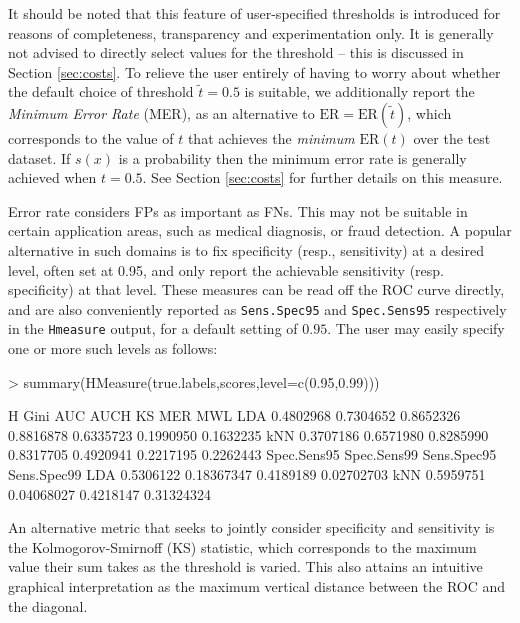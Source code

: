 \documentclass{article}
\begin{document}
It should be noted that this feature of user-specified thresholds is introduced for reasons of completeness, transparency and experimentation only. It is generally not advised to directly select values for the threshold -- this is discussed in Section \ref{sec:costs}. To relieve the user entirely of having to worry about whether the default choice of threshold $\tilde{t}=0.5$ is suitable, we additionally report the \emph{Minimum Error Rate} (MER), as an alternative to  $\text{ER} = \text{ER}(\tilde{t})$, which corresponds to the value of $t$ that achieves the \emph{minimum} $\text{ER}(t)$ over the test dataset. If $s(x)$ is a probability then the minimum error rate is generally achieved when $t=0.5$. See Section \ref{sec:costs} for further details on this measure.

Error rate considers FPs as important as FNs. This may not be suitable in certain application areas, such as medical diagnosis, or fraud detection. A popular alternative in such domains is to fix specificity (resp., sensitivity) at a desired level, often set at 0.95, and only report the achievable sensitivity (resp. specificity) at that level. These measures can be read off the ROC curve directly, and are also conveniently reported as \verb+Sens.Spec95+ and \verb+Spec.Sens95+ respectively in the \verb+Hmeasure+ output, for a default setting of $0.95$. The user may easily specify one or more such levels as follows:
\begin{Schunk}
\begin{Sinput}
> summary(HMeasure(true.labels,scores,level=c(0.95,0.99)))
\end{Sinput}
\begin{Soutput}
            H      Gini       AUC      AUCH        KS       MER       MWL
LDA 0.4802968 0.7304652 0.8652326 0.8816878 0.6335723 0.1990950 0.1632235
kNN 0.3707186 0.6571980 0.8285990 0.8317705 0.4920941 0.2217195 0.2262443
    Spec.Sens95 Spec.Sens99 Sens.Spec95 Sens.Spec99
LDA   0.5306122  0.18367347   0.4189189  0.02702703
kNN   0.5959751  0.04068027   0.4218147  0.31324324
\end{Soutput}
\end{Schunk}

An alternative metric that seeks to jointly consider specificity and sensitivity is the Kolmogorov-Smirnoff (KS) statistic, which corresponds to the maximum value their sum takes as the threshold is varied. This also attains an intuitive graphical interpretation as the maximum vertical distance between the ROC and the diagonal. 
\end{document}
